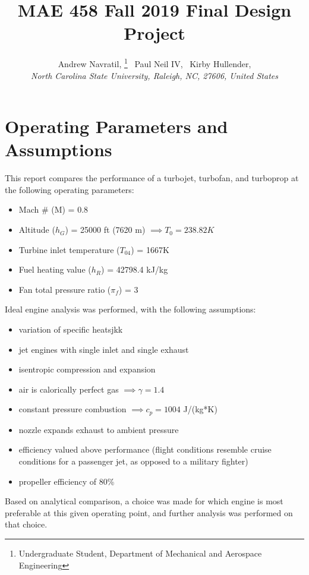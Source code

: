\documentclass[]{aiaa-tc}%
\title{MAE 458 Fall 2019 Final Design Project}
\author{Andrew Navratil,%
    \thanks{Undergraduate Student, Department of Mechanical and Aerospace Engineering}
 \ Paul Neil IV,\thanksibid{1}
 \ Kirby Hullender,\thanksibid{1}\\
 {\normalsize\itshape
  North Carolina State University, Raleigh, NC, 27606, United States}
 }
\begin{document}
\maketitle

\section{Operating Parameters and Assumptions}

This report compares the performance of a turbojet, turbofan, and turboprop at the following operating parameters\cite{handout}:

\begin{itemize}
	\item Mach \# (M) = 0.8
	\item Altitude ($h_{G}$) = 25000 ft (7620 m) $\implies T_{0} = 238.82K$\cite{anderson}
	\item Turbine inlet temperature ($T_{04}$) = 1667K
	\item Fuel heating value ($h_{R}$) = 42798.4 kJ/kg
	\item Fan total pressure ratio ($\pi_{f}$) = 3
\end{itemize}

\noindent
Ideal engine analysis was performed, with the following assumptions:

\begin{itemize}
	\item variation of specific heatsjkk
	\item jet engines with single inlet and single exhaust
	\item isentropic compression and expansion
	\item air is calorically perfect gas $\implies \gamma = 1.4$
	\item constant pressure combustion $\implies c_{p} = 1004$ J/(kg*K)
	\item nozzle expands exhaust to ambient pressure
	\item efficiency valued above performance (flight conditions resemble cruise conditions for a passenger jet, as opposed to a military fighter)
	\item propeller efficiency of 80\%
\end{itemize}

\noindent
Based on analytical comparison, a choice was made for which engine is most preferable at this given operating point, and further analysis was performed on that choice.
\end{document}
